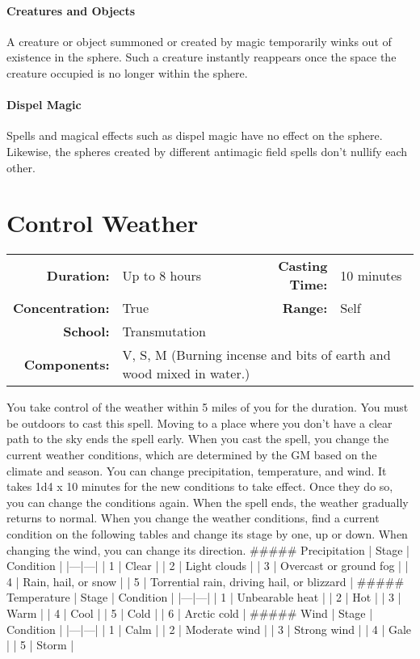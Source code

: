 \documentclass[a5paper, 12pt]{memoir}
\begin{document}
\paragraph{Creatures and Objects} A creature or object summoned or created by magic temporarily winks out of existence in the sphere. Such a creature instantly reappears once the space the creature occupied is no longer within the sphere. \paragraph{Dispel Magic} Spells and magical effects such as dispel magic have no effect on the sphere. Likewise, the spheres created by different antimagic field spells don't nullify each other.

\newpage
\section*{Control Weather}

{
\small\centering\vspace{-6pt}
\begin{tabular}{rlrl}
\toprule

\textbf{Duration:} & Up to 8 hours &
\textbf{Casting Time:} & 10 minutes \\
\textbf{Concentration:} & True &
\textbf{Range:} & Self \\
\textbf{School:} & Transmutation \\
\textbf{Components:} & \multicolumn{3}{p{0.7\textwidth}}{V, S, M (Burning incense and bits of earth and wood mixed in water.)}\\

\bottomrule
\end{tabular}
}

\vspace{1\baselineskip}\noindent You take control of the weather within 5 miles of you for the duration. You must be outdoors to cast this spell. Moving to a place where you don't have a clear path to the sky ends the spell early. When you cast the spell, you change the current weather conditions, which are determined by the GM based on the climate and season. You can change precipitation, temperature, and wind. It takes 1d4 x 10 minutes for the new conditions to take effect. Once they do so, you can change the conditions again. When the spell ends, the weather gradually returns to normal. When you change the weather conditions, find a current condition on the following tables and change its stage by one, up or down. When changing the wind, you can change its direction. \#\#\#\#\# Precipitation | Stage | Condition | |---|---| | 1 | Clear | | 2 | Light clouds | | 3 | Overcast or ground fog | | 4 | Rain, hail, or snow | | 5 | Torrential rain, driving hail, or blizzard | \#\#\#\#\# Temperature | Stage | Condition | |---|---| | 1 | Unbearable heat | | 2 | Hot | | 3 | Warm | | 4 | Cool | | 5 | Cold | | 6 | Arctic cold | \#\#\#\#\# Wind | Stage | Condition | |---|---| | 1 | Calm | | 2 | Moderate wind | | 3 | Strong wind | | 4 | Gale | | 5 | Storm |
\end{document}
